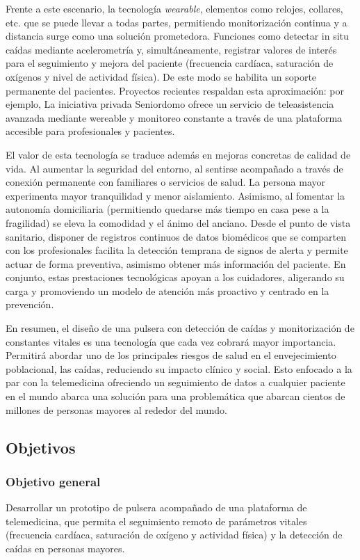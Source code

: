 \documentclass[12pt, a4paper]{article}
\begin{document}
    Frente a este escenario, la tecnología \emph{wearable}, elementos como relojes, collares, etc. que se puede llevar a todas partes, permitiendo monitorización continua y a distancia surge como una solución prometedora. Funciones como detectar in situ caídas mediante acelerometría y, simultáneamente, registrar valores de interés para el seguimiento y mejora del paciente (frecuencia cardíaca, saturación de oxígenos y nivel de actividad física). De este modo se habilita un soporte permanente del pacientes. Proyectos recientes respaldan esta aproximación: por ejemplo, La iniciativa privada Seniordomo ofrece un servicio de teleasistencia avanzada mediante wereable y monitoreo constante a través de una plataforma accesible para profesionales y pacientes\cite{seniordomo}. 
    
    El valor de esta tecnología se traduce además en mejoras concretas de calidad de vida. Al aumentar la seguridad del entorno, al sentirse acompañado a través de conexión permanente con familiares o servicios de salud. La persona mayor experimenta mayor tranquilidad y menor aislamiento\cite{Reina2024}. Asimismo, al fomentar la autonomía domiciliaria (permitiendo quedarse más tiempo en casa pese a la fragilidad) se eleva la comodidad y el ánimo del anciano\cite{Reina2024}. Desde el punto de vista sanitario, disponer de registros continuos de datos biomédicos que se comparten con los profesionales facilita la detección temprana de signos de alerta y permite actuar de forma preventiva, asimismo obtener más información del paciente. En conjunto, estas prestaciones tecnológicas apoyan a los cuidadores, aligerando su carga y promoviendo un modelo de atención más proactivo y centrado en la prevención.
    
    En resumen, el diseño de una pulsera con detección de caídas y monitorización de constantes vitales es una tecnología que cada vez cobrará mayor importancia. Permitirá abordar uno de los principales riesgos de salud en el envejecimiento poblacional, las caídas, reduciendo su impacto clínico y social. Esto enfocado a la par con la telemedicina ofreciendo un seguimiento de datos a cualquier paciente en el mundo abarca una solución para una problemática que abarcan cientos de millones de personas mayores al rededor del mundo.

	\subsection{Objetivos}
	
	\subsubsection{Objetivo general}
	Desarrollar un prototipo de pulsera acompañado de una plataforma de telemedicina, que permita el seguimiento remoto de parámetros vitales (frecuencia cardíaca, saturación de oxígeno y actividad física) y la detección de caídas en personas mayores.
	
\end{document}

